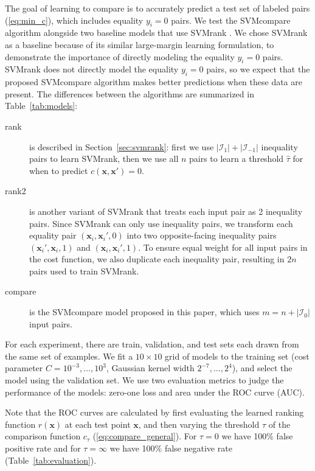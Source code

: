\documentclass[twoside,11pt]{article}
\begin{document}
The goal of learning to compare is to accurately predict a test set of
labeled pairs (\ref{eq:min_c}), which includes equality $y_i=0$
pairs. We test the SVMcompare algorithm alongside two baseline models
that use SVMrank \citep{ranksvm}. We chose SVMrank as a baseline
because of its similar large-margin learning formulation, to
demonstrate the importance of directly modeling the equality $y_i=0$
pairs. SVMrank does not directly model the equality $y_i=0$ pairs, so
we expect that the proposed SVMcompare algorithm makes better
predictions when these data are present. The differences between the
algorithms are summarized in Table~\ref{tab:models}:

\begin{description}
\item[rank] is described in Section~\ref{sec:svmrank}: first we use
  $|\mathcal I_1|+|\mathcal I_{-1}|$ inequality pairs to learn
  SVMrank, then we use all $n$ pairs to learn a threshold $\hat \tau$
  for when to predict $c(\mathbf x,\mathbf x')=0$.
\item[rank2] is another variant of SVMrank that treats each input pair
  as 2 inequality pairs. Since SVMrank can only use inequality pairs,
  we transform each equality pair $(\mathbf x_i,\mathbf x_i',0)$ into two
  opposite-facing inequality pairs $(\mathbf x_i',\mathbf x_i,1)$ and
  $(\mathbf x_i,\mathbf x_i',1)$. 
  To ensure equal weight for all input pairs in the
  cost function, we also duplicate each inequality pair, resulting in
  $2n$ pairs used to train SVMrank.
\item[compare] is the SVMcompare model proposed in this paper, which
  uses $m=n+|\mathcal I_0|$ input pairs.
\end{description}

For each experiment, there are train, validation, and test sets each
drawn from the same set of examples. We fit a $10\times 10$ grid of
models to the training set (cost parameter $C=10^{-3},\dots,10^3$,
Gaussian kernel width $2^{-7},\dots,2^4$), and select the model using
the validation set. We use two evaluation metrics to judge the
performance of the models: zero-one loss and area under the ROC curve
(AUC).

Note that the ROC curves are calculated by first evaluating the
learned ranking function $r(\mathbf x)$ at each test point $\mathbf
x$, and then varying the threshold $\tau$ of the comparison function
$c_\tau$ (\ref{eq:compare_general}). For $\tau=0$ we have 100\% false
positive rate and for $\tau=\infty$ we have 100\% false negative rate
(Table~\ref{tab:evaluation}).
\end{document}
